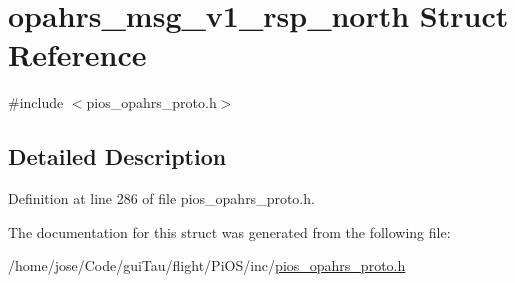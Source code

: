 \hypertarget{structopahrs__msg__v1__rsp__north}{\section{opahrs\-\_\-msg\-\_\-v1\-\_\-rsp\-\_\-north Struct Reference}
\label{structopahrs__msg__v1__rsp__north}
}


{\ttfamily \#include $<$pios\-\_\-opahrs\-\_\-proto.\-h$>$}



\subsection{Detailed Description}


Definition at line 286 of file pios\-\_\-opahrs\-\_\-proto.\-h.



The documentation for this struct was generated from the following file\-:\begin{DoxyCompactItemize}
\item 
/home/jose/\-Code/gui\-Tau/flight/\-Pi\-O\-S/inc/\hyperlink{pios__opahrs__proto_8h}{pios\-\_\-opahrs\-\_\-proto.\-h}\end{DoxyCompactItemize}
